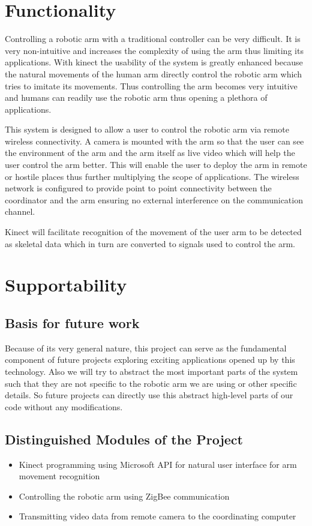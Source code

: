 \documentclass[a4wide]{scrreprt}
\begin{document}
\section{Functionality}
\indent Controlling a robotic arm with a traditional controller can be very difficult. It is very non-intuitive and increases the complexity of using the arm thus limiting its applications. With kinect the usability of the system is greatly enhanced because the natural movements of the human arm directly control the robotic arm which tries to imitate its movements. Thus controlling the arm becomes very intuitive and humans can readily use the robotic arm thus opening a plethora of applications.

\indent This system is designed to allow a user to control the robotic arm via remote wireless connectivity. A camera is mounted with the arm so that the user can see the environment of the arm and the arm itself as live video which will help the user control the arm better. This will enable the user to deploy the arm in remote or hostile places thus further multiplying the scope of applications. The wireless network is configured to provide point to point connectivity between the coordinator and the arm ensuring no external interference on the communication channel. 

\indent Kinect will facilitate recognition of the movement of the user arm to be detected as skeletal data which in turn are converted to signals used to control the arm.


\section{Supportability}

\subsection{Basis for future work}
\indent Because of its very general nature, this project can serve as the fundamental component of future projects exploring exciting applications opened up by this technology. Also we will try to abstract the most important parts of the system such that they are not specific to the robotic arm we are using or other specific details. So future projects can directly use this abstract high-level parts of our code without any modifications.

\subsection{Distinguished Modules of the Project}
\begin{itemize}
\item Kinect programming using Microsoft API for natural user interface for arm movement recognition
\item Controlling the robotic arm using ZigBee communication
\item Transmitting video data from remote camera to the coordinating computer
\end{itemize}
\end{document}
